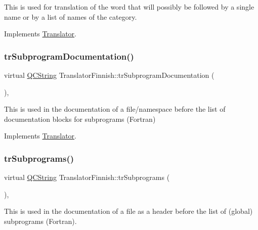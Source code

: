 This is used for translation of the word that will possibly be followed by a single name or by a list of names of the category. 

Implements \mbox{\hyperlink{class_translator}{Translator}}.

\mbox{\label{class_translator_finnish_a211b1c7ec64ec9d7837c8605b0f43096}} 
\subsubsection{\texorpdfstring{trSubprogramDocumentation()}{trSubprogramDocumentation()}}
{\footnotesize\ttfamily virtual \mbox{\hyperlink{class_q_c_string}{Q\+C\+String}} Translator\+Finnish\+::tr\+Subprogram\+Documentation (\begin{DoxyParamCaption}{ }\end{DoxyParamCaption})\hspace{0.3cm}{\ttfamily [inline]}, {\ttfamily [virtual]}}

This is used in the documentation of a file/namespace before the list of documentation blocks for subprograms (Fortran) 

Implements \mbox{\hyperlink{class_translator}{Translator}}.

\mbox{\label{class_translator_finnish_a7d476888e2e68585fd9d61e5502c1d63}} 
\subsubsection{\texorpdfstring{trSubprograms()}{trSubprograms()}}
{\footnotesize\ttfamily virtual \mbox{\hyperlink{class_q_c_string}{Q\+C\+String}} Translator\+Finnish\+::tr\+Subprograms (\begin{DoxyParamCaption}{ }\end{DoxyParamCaption})\hspace{0.3cm}{\ttfamily [inline]}, {\ttfamily [virtual]}}

This is used in the documentation of a file as a header before the list of (global) subprograms (Fortran). 

